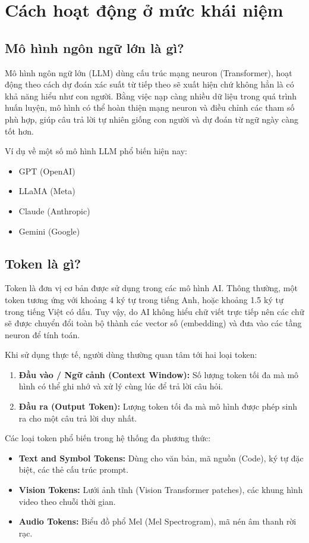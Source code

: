 \documentclass[12pt,a4paper]{article}
\begin{document}
\section{Cách hoạt động ở mức khái niệm}
\subsection{Mô hình ngôn ngữ lớn là gì?}
Mô hình ngôn ngữ lớn (LLM) dùng cấu trúc mạng neuron (Transformer), hoạt động theo cách dự đoán xác suất từ tiếp theo sẽ xuất hiện chứ không hẳn là có khả năng hiểu như con người. Bằng việc nạp càng nhiều dữ liệu trong quá trình huấn luyện, mô hình có thể hoàn thiện mạng neuron và điều chỉnh các tham số phù hợp, giúp câu trả lời tự nhiên giống con người và dự đoán từ ngữ ngày càng tốt hơn.

Ví dụ về một số mô hình LLM phổ biến hiện nay:
\begin{itemize}
  \item GPT (OpenAI)
  \item LLaMA (Meta)
  \item Claude (Anthropic)
  \item Gemini (Google)
\end{itemize}

\subsection{Token là gì?}
Token là đơn vị cơ bản được sử dụng trong các mô hình AI. Thông thường, một token tương ứng với khoảng 4 ký tự trong tiếng Anh, hoặc khoảng 1.5 ký tự trong tiếng Việt có dấu. Tuy vậy, do AI không hiểu chữ viết trực tiếp nên các chữ sẽ được chuyển đổi toàn bộ thành các vector số (embedding) và đưa vào các tầng neuron để tính toán.

Khi sử dụng thực tế, người dùng thường quan tâm tới hai loại token:
\begin{enumerate}
  \item \textbf{Đầu vào / Ngữ cảnh (Context Window):} Số lượng token tối đa mà mô hình có thể ghi nhớ và xử lý cùng lúc để trả lời câu hỏi.
  \item \textbf{Đầu ra (Output Token):} Lượng token tối đa mà mô hình được phép sinh ra cho một câu trả lời duy nhất.
\end{enumerate}

Các loại token phổ biến trong hệ thống đa phương thức:
\begin{itemize}
  \item \textbf{Text and Symbol Tokens:} Dùng cho văn bản, mã nguồn (Code), ký tự đặc biệt, các thẻ cấu trúc prompt.
  \item \textbf{Vision Tokens:} Lưới ảnh tĩnh (Vision Transformer patches), các khung hình video theo chuỗi thời gian.
  \item \textbf{Audio Tokens:} Biểu đồ phổ Mel (Mel Spectrogram), mã nén âm thanh rời rạc.
\end{itemize}
\end{document}
